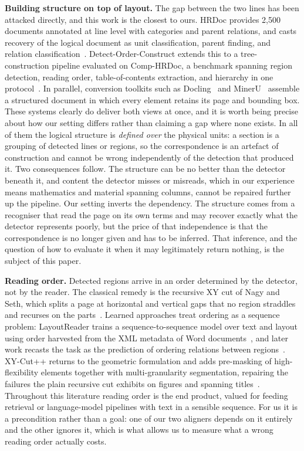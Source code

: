 \documentclass[11pt,twoside]{article}
\begin{document}
\textbf{Building structure on top of layout.} The gap between the two lines has been attacked directly, and this work is the closest to ours. HRDoc provides 2,500 documents annotated at line level with categories and parent relations, and casts recovery of the logical document as unit classification, parent finding, and relation classification~\cite{hrdoc}. Detect-Order-Construct extends this to a tree-construction pipeline evaluated on Comp-HRDoc, a benchmark spanning region detection, reading order, table-of-contents extraction, and hierarchy in one protocol~\cite{doc}. In parallel, conversion toolkits such as Docling~\cite{docling} and MinerU~\cite{mineru} assemble a structured document in which every element retains its page and bounding box. These systems clearly do deliver both views at once, and it is worth being precise about how our setting differs rather than claiming a gap where none exists. In all of them the logical structure is \emph{defined over} the physical units: a section is a grouping of detected lines or regions, so the correspondence is an artefact of construction and cannot be wrong independently of the detection that produced it. Two consequences follow. The structure can be no better than the detector beneath it, and content the detector misses or misreads, which in our experience means mathematics and material spanning columns, cannot be repaired further up the pipeline. Our setting inverts the dependency. The structure comes from a recogniser that read the page on its own terms and may recover exactly what the detector represents poorly, but the price of that independence is that the correspondence is no longer given and has to be inferred. That inference, and the question of how to evaluate it when it may legitimately return nothing, is the subject of this paper.

\textbf{Reading order.} Detected regions arrive in an order determined by the detector, not by the reader. The classical remedy is the recursive XY cut of Nagy and Seth, which splits a page at horizontal and vertical gaps that no region straddles and recurses on the parts~\cite{nagy84}. Learned approaches treat ordering as a sequence problem: LayoutReader trains a sequence-to-sequence model over text and layout using order harvested from the XML metadata of Word documents~\cite{layoutreader}, and later work recasts the task as the prediction of ordering relations between regions~\cite{orderrel}. XY-Cut++ returns to the geometric formulation and adds pre-masking of high-flexibility elements together with multi-granularity segmentation, repairing the failures the plain recursive cut exhibits on figures and spanning titles~\cite{xycutpp}. Throughout this literature reading order is the end product, valued for feeding retrieval or language-model pipelines with text in a sensible sequence. For us it is a precondition rather than a goal: one of our two aligners depends on it entirely and the other ignores it, which is what allows us to measure what a wrong reading order actually costs.
\end{document}
